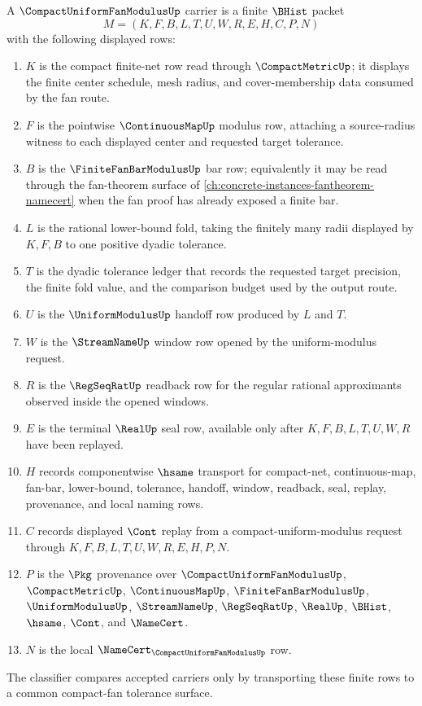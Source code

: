 \begin{definition}
\label{def:compact-uniform-fan-modulus-carrier}
A $\CompactUniformFanModulusUp$ carrier is a finite $\BHist$ packet
$$
M=(K,F,B,L,T,U,W,R,E,H,C,P,N)
$$
with the following displayed rows:
\begin{enumerate}
\item $K$ is the compact finite-net row read through $\CompactMetricUp$; it displays the finite center schedule, mesh radius, and cover-membership data consumed by the fan route.
\item $F$ is the pointwise $\ContinuousMapUp$ modulus row, attaching a source-radius witness to each displayed center and requested target tolerance.
\item $B$ is the $\FiniteFanBarModulusUp$ bar row; equivalently it may be read through the fan-theorem surface of \autoref{ch:concrete-instances-fantheorem-namecert} when the fan proof has already exposed a finite bar.
\item $L$ is the rational lower-bound fold, taking the finitely many radii displayed by $K,F,B$ to one positive dyadic tolerance.
\item $T$ is the dyadic tolerance ledger that records the requested target precision, the finite fold value, and the comparison budget used by the output route.
\item $U$ is the $\UniformModulusUp$ handoff row produced by $L$ and $T$.
\item $W$ is the $\StreamNameUp$ window row opened by the uniform-modulus request.
\item $R$ is the $\RegSeqRatUp$ readback row for the regular rational approximants observed inside the opened windows.
\item $E$ is the terminal $\RealUp$ seal row, available only after $K,F,B,L,T,U,W,R$ have been replayed.
\item $H$ records componentwise $\hsame$ transport for compact-net, continuous-map, fan-bar, lower-bound, tolerance, handoff, window, readback, seal, replay, provenance, and local naming rows.
\item $C$ records displayed $\Cont$ replay from a compact-uniform-modulus request through $K,F,B,L,T,U,W,R,E,H,P,N$.
\item $P$ is the $\Pkg$ provenance over $\CompactUniformFanModulusUp$, $\CompactMetricUp$, $\ContinuousMapUp$, $\FiniteFanBarModulusUp$, $\UniformModulusUp$, $\StreamNameUp$, $\RegSeqRatUp$, $\RealUp$, $\BHist$, $\hsame$, $\Cont$, and $\NameCert$.
\item $N$ is the local $\NameCert_{\CompactUniformFanModulusUp}$ row.
\end{enumerate}
The classifier compares accepted carriers only by transporting these finite rows to a common compact-fan tolerance surface.
\end{definition}


